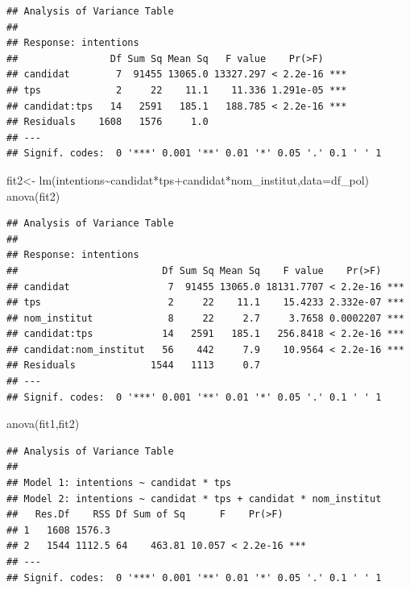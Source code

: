 \documentclass[
]{book}
\newenvironment{Shaded}{\begin{snugshade}}{\end{snugshade}}
\newcommand{\AttributeTok}[1]{\textcolor[rgb]{0.77,0.63,0.00}{#1}}
\newcommand{\FunctionTok}[1]{\textcolor[rgb]{0.00,0.00,0.00}{#1}}
\newcommand{\NormalTok}[1]{#1}
\newcommand{\OtherTok}[1]{\textcolor[rgb]{0.56,0.35,0.01}{#1}}
\newcommand{\SpecialCharTok}[1]{\textcolor[rgb]{0.00,0.00,0.00}{#1}}
\begin{document}
\begin{verbatim}
## Analysis of Variance Table
## 
## Response: intentions
##                Df Sum Sq Mean Sq   F value    Pr(>F)    
## candidat        7  91455 13065.0 13327.297 < 2.2e-16 ***
## tps             2     22    11.1    11.336 1.291e-05 ***
## candidat:tps   14   2591   185.1   188.785 < 2.2e-16 ***
## Residuals    1608   1576     1.0                        
## ---
## Signif. codes:  0 '***' 0.001 '**' 0.01 '*' 0.05 '.' 0.1 ' ' 1
\end{verbatim}

\begin{Shaded}
\begin{Highlighting}[]
\NormalTok{fit2}\OtherTok{\textless{}{-}} \FunctionTok{lm}\NormalTok{(intentions}\SpecialCharTok{\textasciitilde{}}\NormalTok{candidat}\SpecialCharTok{*}\NormalTok{tps}\SpecialCharTok{+}\NormalTok{candidat}\SpecialCharTok{*}\NormalTok{nom\_institut,}\AttributeTok{data=}\NormalTok{df\_pol)}
\FunctionTok{anova}\NormalTok{(fit2)}
\end{Highlighting}
\end{Shaded}

\begin{verbatim}
## Analysis of Variance Table
## 
## Response: intentions
##                         Df Sum Sq Mean Sq    F value    Pr(>F)    
## candidat                 7  91455 13065.0 18131.7707 < 2.2e-16 ***
## tps                      2     22    11.1    15.4233 2.332e-07 ***
## nom_institut             8     22     2.7     3.7658 0.0002207 ***
## candidat:tps            14   2591   185.1   256.8418 < 2.2e-16 ***
## candidat:nom_institut   56    442     7.9    10.9564 < 2.2e-16 ***
## Residuals             1544   1113     0.7                         
## ---
## Signif. codes:  0 '***' 0.001 '**' 0.01 '*' 0.05 '.' 0.1 ' ' 1
\end{verbatim}

\begin{Shaded}
\begin{Highlighting}[]
\FunctionTok{anova}\NormalTok{(fit1,fit2)}
\end{Highlighting}
\end{Shaded}

\begin{verbatim}
## Analysis of Variance Table
## 
## Model 1: intentions ~ candidat * tps
## Model 2: intentions ~ candidat * tps + candidat * nom_institut
##   Res.Df    RSS Df Sum of Sq      F    Pr(>F)    
## 1   1608 1576.3                                  
## 2   1544 1112.5 64    463.81 10.057 < 2.2e-16 ***
## ---
## Signif. codes:  0 '***' 0.001 '**' 0.01 '*' 0.05 '.' 0.1 ' ' 1
\end{verbatim}
\end{document}

